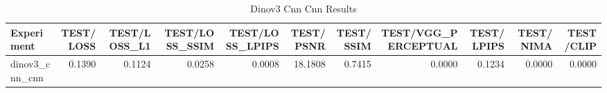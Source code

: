 \begin{table}[htbp]
\centering
\caption{Dinov3 Cnn Cnn Results}
\label{tab:dinov3_cnn_cnn_results}
\begin{tabular}{lrrrrrrrrrr}
\toprule
Experiment & TEST/LOSS & TEST/LOSS_L1 & TEST/LOSS_SSIM & TEST/LOSS_LPIPS & TEST/PSNR & TEST/SSIM & TEST/VGG_PERCEPTUAL & TEST/LPIPS & TEST/NIMA & TEST/CLIP \\
\midrule
dinov3_cnn_cnn & 0.1390 & 0.1124 & 0.0258 & 0.0008 & 18.1808 & 0.7415 & 0.0000 & 0.1234 & 0.0000 & 0.0000 \\
\bottomrule
\end{tabular}
\end{table}

